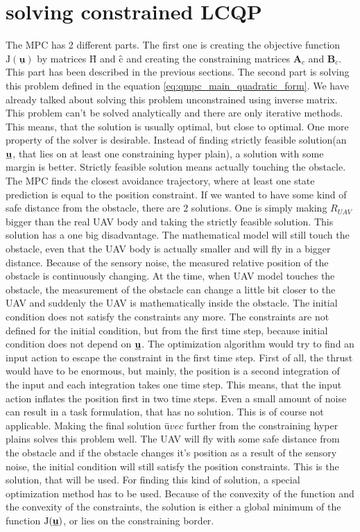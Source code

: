 \documentclass{article}
\newcommand{\uvec}{\textbf{\underline{u}}}
\begin{document}
\section{solving constrained LCQP}
The MPC has 2 different parts. The first one is creating the objective function $\mathrm{J}(\underline{\textbf{u}})$ by matrices $\textbf{\^H}$ and $\textbf{\^c}$ and creating the constraining matrices $\textbf{A}_c$ and $\textbf{B}_c$. This part has been described in the previous sections. The second part is solving this problem defined in the equation \ref{eq:qmpc_main_quadratic_form}. We have already talked about solving this problem unconstrained using inverse matrix. This problem can't be solved analytically and there are only iterative methods. This means, that the solution is usually optimal, but close to optimal. One more property of the solver is desirable. Instead of finding strictly feasible solution(an $\uvec$, that lies on at least one constraining hyper plain), a solution with some margin is better. Strictly feasible solution means actually touching the obstacle. The MPC finds the closest avoidance trajectory, where at least one state prediction is equal to the position constraint. If we wanted to have some kind of safe distance from the obstacle, there are 2 solutions. One is simply making $R_{UAV}$ bigger than the real UAV body and taking the strictly feasible solution. This solution has a one big disadvantage. The mathematical model will still touch the obstacle, even that the UAV body is actually smaller and will fly in a bigger distance. Because of the sensory noise, the measured relative position of the obstacle is continuously changing. At the time, when UAV model touches the obstacle, the measurement of the obstacle can change a little bit closer to the UAV and suddenly the UAV is mathematically inside the obstacle. The initial condition does not satisfy the constraints any more. The constraints are not defined for the initial condition, but from the first time step, because initial condition does not depend on $\uvec$. The optimization algorithm would try to find an input action to escape the constraint in the first time step. First of all, the thrust would have to be enormous, but mainly, the position is a second integration of the input and each integration takes one time step. This means, that the input action inflates the position first in two time steps. Even a small amount of noise can result in a task formulation, that has no solution. This is of course not applicable. Making the final solution $üvec$ further from the constraining hyper plains solves this problem well. The UAV will fly with some safe distance from the obstacle and if the obstacle changes it's position as a result of the sensory noise, the initial condition will still satisfy the position constraints. This is the solution, that will be used. For finding this kind of solution, a special optimization method has to be used. Because of the convexity of the function and the convexity of the constraints, the solution is either a global minimum of the function $\mathrm{J}(\uvec)$, or lies on the constraining border.
\end{document}

